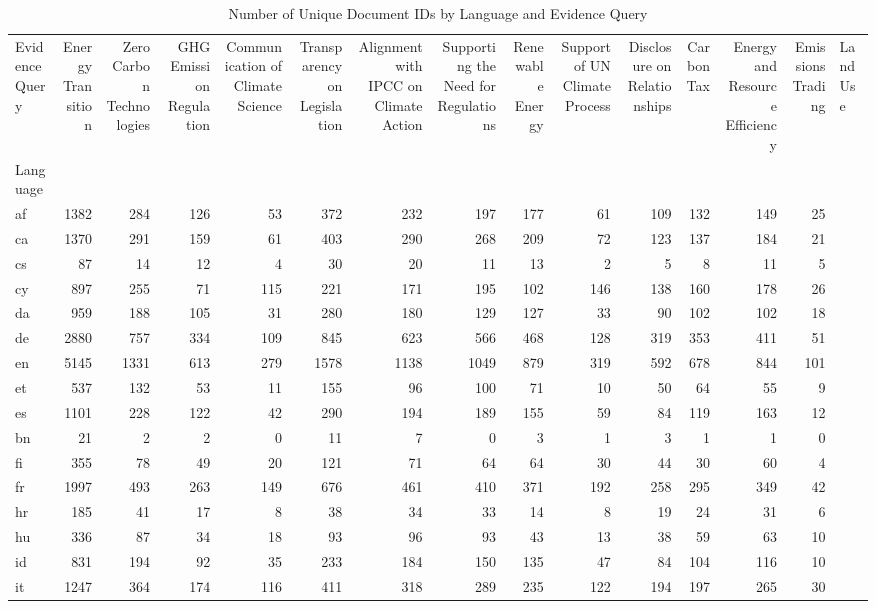 \begin{table}
\caption{Number of Unique Document IDs by Language and Evidence Query}
\begin{tabular}{lrrrrrrrrrrrrr}
\toprule
Evidence Query & Energy Transition & Zero Carbon Technologies & GHG Emission Regulation & Communication of Climate Science & Transparency on Legislation & Alignment with IPCC on Climate Action & Supporting the Need for Regulations & Renewable Energy & Support of UN Climate Process & Disclosure on Relationships & Carbon Tax & Energy and Resource Efficiency & Emissions Trading & Land Use \\
Language &  &  &  &  &  &  &  &  &  &  &  &  &  \\
\midrule
af & 1382 & 284 & 126 & 53 & 372 & 232 & 197 & 177 & 61 & 109 & 132 & 149 & 25 \\
ca & 1370 & 291 & 159 & 61 & 403 & 290 & 268 & 209 & 72 & 123 & 137 & 184 & 21 \\
cs & 87 & 14 & 12 & 4 & 30 & 20 & 11 & 13 & 2 & 5 & 8 & 11 & 5 \\
cy & 897 & 255 & 71 & 115 & 221 & 171 & 195 & 102 & 146 & 138 & 160 & 178 & 26 \\
da & 959 & 188 & 105 & 31 & 280 & 180 & 129 & 127 & 33 & 90 & 102 & 102 & 18 \\
de & 2880 & 757 & 334 & 109 & 845 & 623 & 566 & 468 & 128 & 319 & 353 & 411 & 51 \\
en & 5145 & 1331 & 613 & 279 & 1578 & 1138 & 1049 & 879 & 319 & 592 & 678 & 844 & 101 \\
et & 537 & 132 & 53 & 11 & 155 & 96 & 100 & 71 & 10 & 50 & 64 & 55 & 9 \\
es & 1101 & 228 & 122 & 42 & 290 & 194 & 189 & 155 & 59 & 84 & 119 & 163 & 12 \\
bn & 21 & 2 & 2 & 0 & 11 & 7 & 0 & 3 & 1 & 3 & 1 & 1 & 0 \\
fi & 355 & 78 & 49 & 20 & 121 & 71 & 64 & 64 & 30 & 44 & 30 & 60 & 4 \\
fr & 1997 & 493 & 263 & 149 & 676 & 461 & 410 & 371 & 192 & 258 & 295 & 349 & 42 \\
hr & 185 & 41 & 17 & 8 & 38 & 34 & 33 & 14 & 8 & 19 & 24 & 31 & 6 \\
hu & 336 & 87 & 34 & 18 & 93 & 96 & 93 & 43 & 13 & 38 & 59 & 63 & 10 \\
id & 831 & 194 & 92 & 35 & 233 & 184 & 150 & 135 & 47 & 84 & 104 & 116 & 10 \\
it & 1247 & 364 & 174 & 116 & 411 & 318 & 289 & 235 & 122 & 194 & 197 & 265 & 30 \\

\end{tabular}
\end{table}
